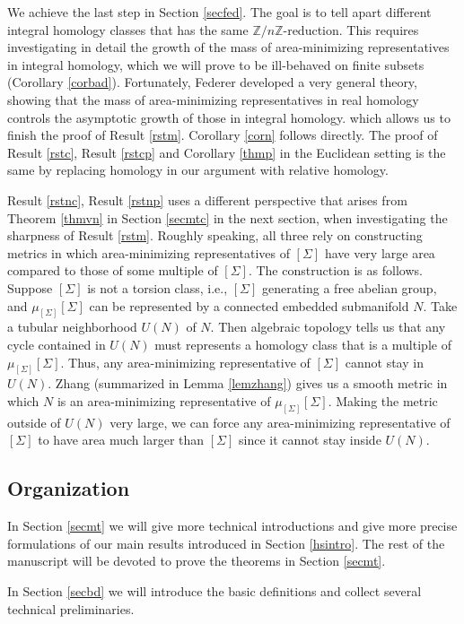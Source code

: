 \documentclass[11pt,a4paper]{amsart}
\numberwithin{equation}{section}
\newcommand{\Si}{\Sigma}
\newcommand{\Z}{\mathbb{Z}}
\theoremstyle{plain}
\theoremstyle{definition}
\numberwithin{equation}{subsection}
\begin{document}
We achieve the last step in Section \ref{secfed}. The goal is to tell apart different integral homology classes that has the same $\Z/n\Z$-reduction. This requires investigating in detail the growth of the mass of area-minimizing representatives in integral homology, which we will prove to be ill-behaved on finite subsets (Corollary \ref{corbad}). Fortunately, Federer \cite{HFrf} developed a very general theory, showing that the mass of area-minimizing representatives in real homology controls the asymptotic growth of those in integral homology. which allows us to finish the proof of Result \ref{rstm}. Corollary \ref{corn} follows directly. The proof of Result  \ref{rstc}, Result  \ref{rstcp} and Corollary \ref{thmp} in the Euclidean setting is the same by replacing homology in our argument with relative homology. 

Result \ref{rstnc}, Result \ref{rstnp} uses a different perspective that arises from Theorem \ref{thmvn} in Section \ref{secmtc} in the next section, when investigating the sharpness of Result \ref{rstm}. Roughly speaking, all three rely on constructing metrics in which area-minimizing representatives of $[\Si]$ have very large area compared to those of some multiple of $[\Si]$. The construction is as follows. Suppose $[\Si]$ is not a torsion class, i.e., $[\Si]$ generating a free abelian group, and $\mu_{[\Si]}[\Si]$ can be represented by a connected embedded submanifold $N.$ Take a tubular neighborhood $U(N)$ of $N$. Then algebraic topology tells us that any cycle contained in $U(N)$ must represents a homology class that is a multiple of $\mu_{[\Si]}[\Si]$. Thus, any area-minimizing representative of $[\Si]$ cannot stay in $U(N).$ Zhang \cite{YZt,YZa} (summarized in Lemma \ref{lemzhang}) gives us a smooth metric in which $N$ is an area-minimizing representative of $\mu_{[\Si]}[\Si].$ Making the metric outside of $U(N)$ very large, we can force any area-minimizing representative of $[\Si]$ to have area much larger than $[\Si]$ since it cannot stay inside $U(N).$
\subsection{Organization}
In Section \ref{secmt} we will give more technical introductions and give more precise formulations of our main results introduced in Section \ref{hsintro}. The rest of the manuscript will be devoted to prove the theorems in Section \ref{secmt}.

In Section \ref{secbd} we will introduce the basic definitions and collect several technical preliminaries.
\end{document}
